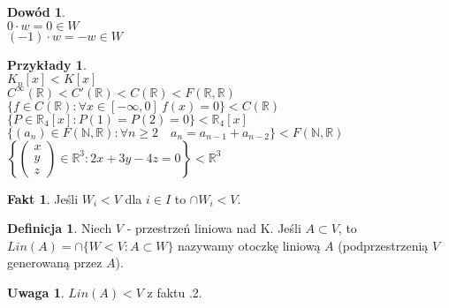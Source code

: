 \documentclass[12pt,a4paper]{article}
\newcommand{\RR}{\mathbb{R}}
\theoremstyle{plain}
\theoremstyle{definition}
\newtheorem{ft}{Fakt}[section]
\theoremstyle{definition}
\newtheorem{df}{Definicja}[section]
\theoremstyle{definition}
\theoremstyle{definition}
\newtheorem*{dd}{Dowód}
\theoremstyle{definition}
\theoremstyle{definition}
\newtheorem*{przy}{Przykłady}
\theoremstyle{definition}
\newtheorem*{uw}{Uwaga}
\theoremstyle{definition}
\begin{document}
\begin{dd} 
    ~\\
    $ 0\cdot w = 0 \in W$ \\
    $(-1)\cdot w = -w \in W$
\end{dd}
\newpage
\begin{przy}
    ~\\
    $K_n[x] < K[x]$ \\ 
    $C^\infty(\RR) < C'(\RR) < C(\RR) < F(\RR,\RR)$ \\
    $\{f \in C(\RR) : \forall x \in [-\infty,0] \ f(x) = 0\} < C(\RR)$ \\
    $\{P \in \RR_4[x] : P(1) = P(2) = 0\} < \RR_4[x]$ \\
    $\{(a_n) \in F(\mathbb{N},\RR) : \forall n \geqslant 2 \quad a_n = a_{n-1} + a_{n-2} \} < F(\mathbb{N},\RR)$ \\
    $\left\{ 
        \begin{pmatrix}
            x \\ 
            y \\ 
            z 
        \end{pmatrix}
        \in \RR^3 : 2x + 3y - 4z = 0
        \right\} < \RR^3
    $
\end{przy}
\begin{ft}
    Jeśli $W_i < V $ dla $i \in I$ to $\cap W_i < V$.
\end{ft}

\begin{df} 
    Niech $V$ - przestrzeń liniowa nad K. Jeśli $A \subset V$, to \\
    $Lin(A) = \cap \{W < V: A \subset W \}$ nazywamy otoczkę liniową $A$ (podprzestrzenią $V$ generowaną przez $A$).
\end{df}
\begin{uw}
    $Lin(A) < V $ z faktu \thesection.2.
\end{uw}
\end{document}
